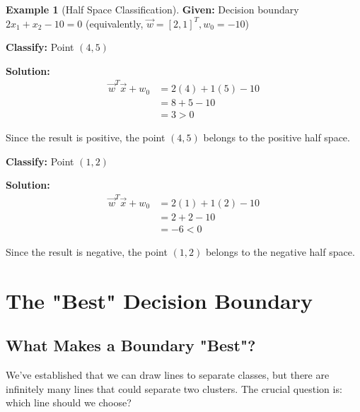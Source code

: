 \documentclass[12pt,a4paper]{article}
\theoremstyle{directpoint}
\theoremstyle{definition}
\newtheorem{example}{Example}[section]
\begin{document}
\begin{example}[Half Space Classification]
\textbf{Given:} Decision boundary $2x_1 + x_2 - 10 = 0$ (equivalently, $\vec{w} = [2, 1]^T, w_0 = -10$)

\textbf{Classify:} Point $(4, 5)$

\textbf{Solution:}
\begin{align}
\vec{w}^T\vec{x} + w_0 &= 2(4) + 1(5) - 10 \\
&= 8 + 5 - 10 \\
&= 3 > 0
\end{align}

Since the result is positive, the point $(4, 5)$ belongs to the positive half space.

\textbf{Classify:} Point $(1, 2)$

\textbf{Solution:}
\begin{align}
\vec{w}^T\vec{x} + w_0 &= 2(1) + 1(2) - 10 \\
&= 2 + 2 - 10 \\
&= -6 < 0
\end{align}

Since the result is negative, the point $(1, 2)$ belongs to the negative half space.
\end{example}

\newpage

\section{The "Best" Decision Boundary}

\subsection{What Makes a Boundary "Best"?}

We've established that we can draw lines to separate classes, but there are infinitely many lines that could separate two clusters. The crucial question is: which line should we choose?
\end{document}
